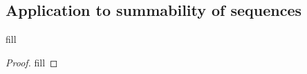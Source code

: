 \subsection{Application to summability of sequences}

\begin{exercise}{1}
fill
\end{exercise}
\begin{proof}
fill
\end{proof}